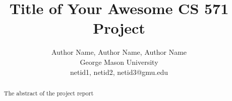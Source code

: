 \documentclass[letterpaper,twocolumn,10pt]{article}
\begin{document}

\date{}

\title{\Large \bf Title of Your Awesome CS 571 Project}

\author{
	Author Name, Author Name, Author Name\\
	{George Mason University}\\
	{netid1, netid2, netid3}@gmu.edu
} 

\maketitle

\begin{abstract}
The abstract of the project report
\end{abstract}










\end{document}
